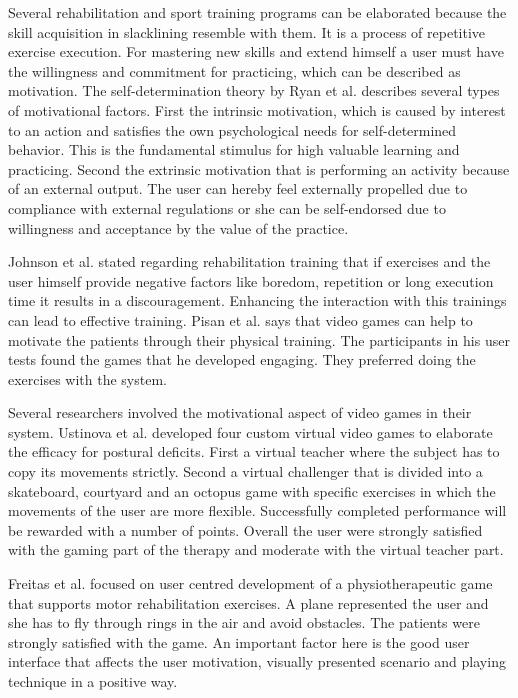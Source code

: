 Several rehabilitation and sport training programs can be elaborated because the skill acquisition in slacklining resemble with them. It is a process of repetitive exercise execution. For mastering new skills and extend himself a user must have the willingness and commitment for practicing, which can be described as motivation. The self-determination theory by Ryan et al. \cite{Ryan2000-gi} \cite{Ryan2000-jn} describes several types of motivational factors. First the intrinsic motivation, which is caused by interest to an action and satisfies the own psychological needs for self-determined behavior. This is the fundamental stimulus for high valuable learning and practicing. Second the extrinsic motivation that is performing an activity because of an external output. The user can hereby feel externally propelled due to compliance with external regulations or she can be self-endorsed due to willingness and acceptance by the value of the practice. 

Johnson et al. \cite{Johnson1998-hb} stated regarding rehabilitation training that if exercises and the user himself provide negative factors like boredom, repetition or long execution time it results in a discouragement. Enhancing the interaction with this trainings can lead to effective training. 
Pisan et al. \cite{Pisan2013-sf} says that video games can help to motivate the patients through their physical training. The participants in his user tests found the games that he developed engaging. They preferred doing the exercises with the system.

Several researchers involved the motivational aspect of video games in their system. Ustinova et al. \cite{Ustinova2014-ml} developed four custom virtual video games to elaborate the efficacy for postural deficits. First a virtual teacher where the subject has to copy its movements strictly. Second a virtual challenger that is divided into a skateboard, courtyard and an octopus game with specific exercises in which the movements of the user are more flexible. Successfully completed performance will be rewarded with a number of points. Overall the user were strongly satisfied with the gaming part of the therapy and moderate with the virtual teacher part.

Freitas et al. \cite{Freitas2012-ae} focused on user centred development of a physiotherapeutic game that supports motor rehabilitation exercises. A plane represented the user and she has to fly through rings in the air and avoid obstacles. The patients were strongly satisfied with the game. An important factor here is the good user interface that affects the user motivation, visually presented scenario and playing technique in a positive way.

